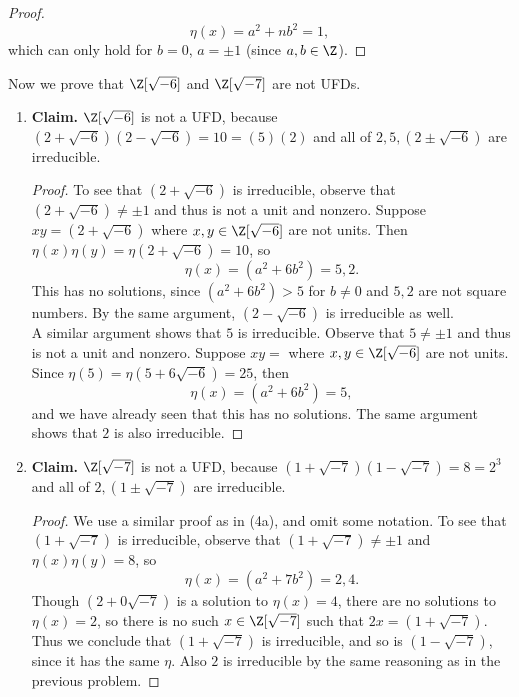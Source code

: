 \documentclass[letterpaper]{article}
\begin{document}
\begin{enumerate}
\begin{proof}
  	$$\eta(x)=a^2+nb^2=1,$$
  	which can only hold for $b=0$, $a=\pm1$ (since $a,b\in\Z$). 
  \end{proof}
 	Now we prove that $\Z[\sqrt{-6}]$ and $\Z[\sqrt{-7}]$ are not UFDs. 
 	\begin{enumerate}[label=\alph*.]
 		\item \textbf{Claim.} $\Z[\sqrt{-6}]$ is not a UFD, because 
 		$(2+\sqrt{-6})(2-\sqrt{-6})=10=(5)(2)$
 		and all of $2, 5, (2\pm\sqrt{-6})$ are irreducible. 
 		\begin{proof}
 			To see that $(2+\sqrt{-6})$ is irreducible, observe that $(2+\sqrt{-6})\neq\pm1$ and thus is not a unit and nonzero. Suppose $xy=(2+\sqrt{-6})$ where $x,y\in\Z[\sqrt{-6}]$ are not units. Then $\eta(x)\eta(y)=\eta(2+\sqrt{-6})=10$, so 
 			$$\eta(x)=(a^2+6b^2)=5,2.$$
 			This has no solutions, since $(a^2+6b^2)>5$ for $b\neq0$ and $5,2$ are not square numbers. By the same argument, $(2-\sqrt{-6})$ is irreducible as well. \\
 			A similar argument shows that $5$ is irreducible. Observe that $5\neq\pm1$ and thus is not a unit and nonzero. Suppose $xy=$ where $x,y\in\Z[\sqrt{-6}]$ are not units. Since $\eta(5)=\eta(5+6\sqrt{-6})=25$, then 
 			$$\eta(x)=(a^2+6b^2)=5, $$
 			and we have already seen that this has no solutions. The same argument shows that $2$ is also irreducible.
 		\end{proof}
 		\item \textbf{Claim.} $\Z[\sqrt{-7}]$ is not a UFD, because $(1+\sqrt{-7})(1-\sqrt{-7})=8=2^3$ and all of $2, (1\pm\sqrt{-7})$ are irreducible. 
		\begin{proof}
	 		We use a similar proof as in (4a), and omit some notation. To see that $(1+\sqrt{-7})$ is irreducible, observe that $(1+\sqrt{-7})\neq\pm1$ and $\eta(x)\eta(y)=8$, so 
 			$$\eta(x)=(a^2+7b^2)=2,4. $$
 			Though $(2+0\sqrt{-7})$ is a solution to $\eta(x)=4$, there are no solutions to $\eta(x)=2$, so there is no such $x\in\Z[\sqrt{-7}]$ such that $2x=(1+\sqrt{-7})$. Thus we conclude that $(1+\sqrt{-7})$ is irreducible, and so is $(1-\sqrt{-7})$, since it has the same $\eta$. Also $2$ is irreducible by the same reasoning as in the previous problem. 
 		\end{proof}		 			
 	\end{enumerate}
\end{enumerate}
\end{document}
